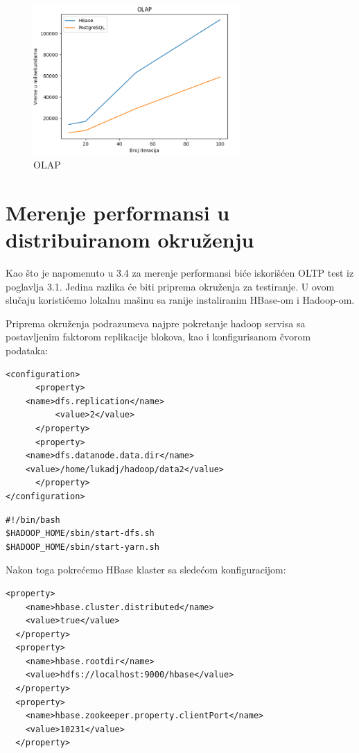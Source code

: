 \documentclass[12pt,oneside]{memoir}
\begin{document}
\begin{figure}[!ht]
  \centering
  \includegraphics[width=0.7\textwidth]{olap-vizualization2.png}
  \caption{OLAP}
  \label{fig:grafikon}
\end{figure}



\section{Merenje performansi u distribuiranom okruženju}

Kao što je napomenuto u 3.4 za merenje performansi biće iskorišćen OLTP test iz poglavlja 3.1. Jedina razlika će biti priprema okruženja za testiranje. U ovom slučaju koristićemo lokalnu mašinu sa ranije instaliranim HBase-om i Hadoop-om. 

Priprema okruženja podrazumeva najpre pokretanje hadoop servisa sa postavljenim faktorom replikacije blokova, kao i konfigurisanom čvorom podataka:

\begin{lstlisting}[title={hdfs-site.xml},captionpos=t]
<configuration>
      <property>
	<name>dfs.replication</name>
          <value>2</value>
      </property>
      <property>
  	<name>dfs.datanode.data.dir</name>
  	<value>/home/lukadj/hadoop/data2</value>
      </property>
</configuration>
\end{lstlisting}

\begin{lstlisting}[title={start-hadoop.sh},captionpos=t]
#!/bin/bash
$HADOOP_HOME/sbin/start-dfs.sh
$HADOOP_HOME/sbin/start-yarn.sh
\end{lstlisting}

Nakon toga pokrećemo HBase klaster sa sledećom konfiguracijom: 

\begin{lstlisting}[title={hbase-site.xml},captionpos=t]
 <property>
    <name>hbase.cluster.distributed</name>
    <value>true</value>
  </property>
  <property>
    <name>hbase.rootdir</name>
    <value>hdfs://localhost:9000/hbase</value>
  </property>
  <property>
    <name>hbase.zookeeper.property.clientPort</name>
    <value>10231</value>
  </property>
\end{lstlisting}
\end{document}
